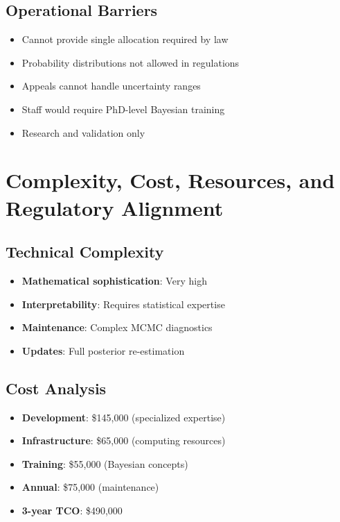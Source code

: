 \subsection{Operational Barriers}

\begin{itemize}
    \item Cannot provide single allocation required by law
    \item Probability distributions not allowed in regulations
    \item Appeals cannot handle uncertainty ranges
    \item Staff would require PhD-level Bayesian training
    \item Research and validation only
\end{itemize}

\section{Complexity, Cost, Resources, and Regulatory Alignment}

\subsection{Technical Complexity}

\begin{itemize}
    \item[\yellowwarning] \textbf{Mathematical sophistication}: Very high
    \item[\yellowwarning] \textbf{Interpretability}: Requires statistical expertise
    \item[\yellowwarning] \textbf{Maintenance}: Complex MCMC diagnostics
    \item[\yellowwarning] \textbf{Updates}: Full posterior re-estimation
\end{itemize}

\subsection{Cost Analysis}

\begin{itemize}
    \item \textbf{Development}: \$145,000 (specialized expertise)
    \item \textbf{Infrastructure}: \$65,000 (computing resources)
    \item \textbf{Training}: \$55,000 (Bayesian concepts)
    \item \textbf{Annual}: \$75,000 (maintenance)
    \item \textbf{3-year TCO}: \$490,000
\end{itemize}

